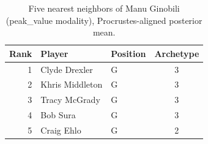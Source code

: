 \begin{table}[htbp]
  \centering\small
  \begin{tabular}{rllc}
    \toprule
    Rank & Player & Position & Archetype \\
    \midrule
    1 & Clyde Drexler & G & 3 \\
    2 & Khris Middleton & G & 3 \\
    3 & Tracy McGrady & G & 3 \\
    4 & Bob Sura & G & 3 \\
    5 & Craig Ehlo & G & 2 \\
    \bottomrule
  \end{tabular}
  \caption{Five nearest neighbors of Manu Ginobili (peak_value modality), Procrustes-aligned posterior mean.}
  \label{tab:Manu_Ginobili_neighbors_peak_value}
\end{table}

